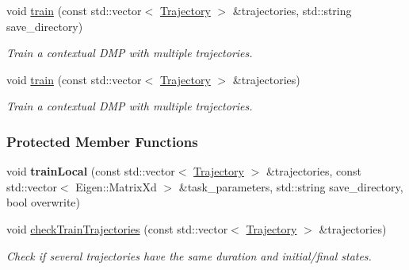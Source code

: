 \begin{DoxyCompactItemize}
void \hyperlink{classDmpBbo_1_1DmpContextual_a69eb7c66ed2f33863212d0d907b84be0}{train} (const std\+::vector$<$ \hyperlink{classDmpBbo_1_1Trajectory}{Trajectory} $>$ \&trajectories, std\+::string save\+\_\+directory)
\begin{DoxyCompactList}\small\item\em Train a contextual D\+M\+P with multiple trajectories. \end{DoxyCompactList}\item 
void \hyperlink{classDmpBbo_1_1DmpContextual_a477f0e9dfd277b1d0e67d9c010e1582c}{train} (const std\+::vector$<$ \hyperlink{classDmpBbo_1_1Trajectory}{Trajectory} $>$ \&trajectories)
\begin{DoxyCompactList}\small\item\em Train a contextual D\+M\+P with multiple trajectories. \end{DoxyCompactList}\end{DoxyCompactItemize}
\subsubsection*{Protected Member Functions}
\begin{DoxyCompactItemize}
\item 
\hypertarget{classDmpBbo_1_1DmpContextual_ad0ba14016c357cccf159667ff561848f}{void {\bfseries train\+Local} (const std\+::vector$<$ \hyperlink{classDmpBbo_1_1Trajectory}{Trajectory} $>$ \&trajectories, const std\+::vector$<$ Eigen\+::\+Matrix\+Xd $>$ \&task\+\_\+parameters, std\+::string save\+\_\+directory, bool overwrite)}\label{classDmpBbo_1_1DmpContextual_ad0ba14016c357cccf159667ff561848f}

\item 
void \hyperlink{classDmpBbo_1_1DmpContextual_aba2e356cdf0cfe688fdcf02ffe68c4d2}{check\+Train\+Trajectories} (const std\+::vector$<$ \hyperlink{classDmpBbo_1_1Trajectory}{Trajectory} $>$ \&trajectories)
\begin{DoxyCompactList}\small\item\em Check if several trajectories have the same duration and initial/final states. \end{DoxyCompactList}\end{DoxyCompactItemize}
